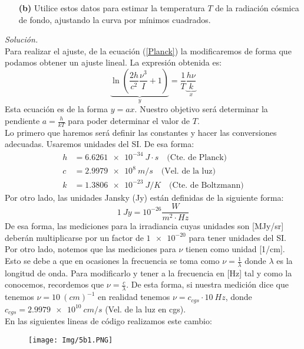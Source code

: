 \documentclass[11pt]{article}
\begin{document}
\begin{enumerate}
	\item [\textbf{(b)}] Utilice estos datos para estimar la temperatura $T$ de la radiación cósmica de fondo, ajustando la curva por mínimos cuadrados.
\end{enumerate}
\textit{Solución.}\\
	Para realizar el ajuste, de la ecuación (\ref{Planck}) la modificaremos de forma que podamos obtener un ajuste lineal. La expresión obtenida es:
	\begin{equation}\label{lineal}
		\underbrace{\ln \left(\frac{2h}{c^2}\frac{\nu^3}{I}+1\right)}_y = \frac{1}{T}\underbrace{\frac{h\nu}{k}}_x
	\end{equation}
	Esta ecuación es de la forma $y = a x$. Nuestro objetivo será determinar la pendiente $a = \frac{h}{kT}$ para poder determinar el valor de $T$.\\
	Lo primero que haremos será definir las constantes y hacer las conversiones adecuadas. Usaremos unidades del SI. De esa forma:
	\begin{align*}
		 h &= \SI{6.6261e-34}{J\cdot s}\quad\text{(Cte. de Planck)}	\\
		 c &= \SI{2.9979e8}{m/ s}\quad\text{(Vel. de la luz)} 	\\
		 k &= \SI{1.3806e-23}{J/ K}\quad\text{(Cte. de Boltzmann)}
	\end{align*}
	Por otro lado, las unidades Jansky (Jy) están definidas de la siguiente forma:
	$$\SI{1}{Jy} = 10^{-26} \frac{\si{W}}{\si{m^2 \cdot Hz}}$$
	De esa forma, las mediciones para la irradiancia cuyas unidades son [MJy/sr] deberán multiplicarse por un factor de $\num{1e-20}$ para tener unidades del SI. Por otro lado, notemos que las mediciones para $\nu$ tienen como unidad [1/cm]. Esto se debe a que en ocasiones la frecuencia se toma como $\nu = \frac{1}{\lambda}$ donde $\lambda$ es la longitud de onda. Para modificarlo y tener a la frecuencia en [Hz] tal y como la conocemos, recordemos que $\nu = \frac{c}{\lambda}$. De esta forma, si nuestra medición dice que tenemos $\nu = \SI{10}{(cm)^{-1}}$ en realidad tenemos $\nu = c_{cgs}\cdot \SI{10}{Hz}$, donde $c_{cgs} = \SI{2.9979e10}{cm/s}$ (Vel. de la luz en cgs).\\
	En las siguientes lineas de código realizamos este cambio:
	\begin{figure}[h]
		\centering
		\texttt{[image: Img/5b1.PNG]}
	\end{figure}
	
\end{document}
